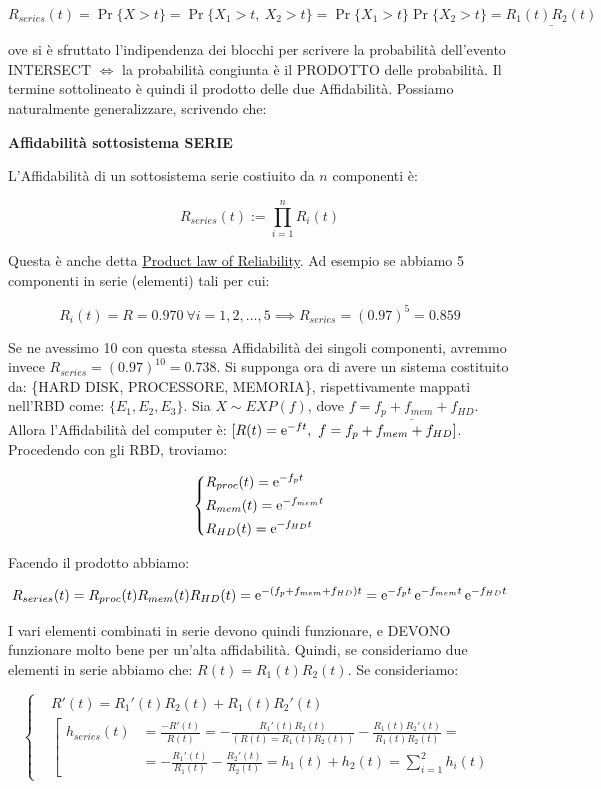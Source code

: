 \[
	R_{series}(t) = \Pr\{X > t\} = \Pr\{X_1 > t,\ X_2 > t\} = \Pr\{X_1 > t\}\Pr\{X_2 > t\} = \underline{R_1(t)R_2(t)}
\]

ove si è sfruttato l'indipendenza dei blocchi per scrivere la probabilità dell'evento INTERSECT $\iff$ la probabilità congiunta è il PRODOTTO delle probabilità. Il termine sottolineato è quindi il prodotto delle due Affidabilità. Possiamo naturalmente generalizzare, scrivendo che:

\begin{thrm}{\textbf{Affidabilità sottosistema SERIE}}

L'Affidabilità di un sottosistema serie costiuito da $n$ componenti è:

\[
	R_{series}(t) := \prod_{i=1}^n{R_i(t)}
\]

\end{thrm}

Questa è anche detta \underline{Product law of Reliability}. Ad esempio se abbiamo 5 componenti in serie (elementi) tali per cui:

\[
	R_i(t) = R = 0.970\ \forall i=1,2,\dots,5 \implies R_{series} = (0.97)^5 = 0.859
\]

Se ne avessimo 10 con questa stessa Affidabilità dei singoli componenti, avremmo invece $R_{series}=(0.97)^{10} = 0.738$. Si supponga ora di avere un sistema costituito da: \{HARD DISK, PROCESSORE, MEMORIA\}, rispettivamente mappati nell'RBD come: $\{E_1,E_2,E_3\}$. Sia $X \sim EXP(f)$, dove $\underline{f = f_p + f_{mem} + f_{HD}}$. Allora l'Affidabilità del computer è: $[R(t) = \mathop{}\!\mathrm{e}^{-ft},\ f = f_p+f_{mem}+f_{HD}]$. 
Procedendo con gli RBD, troviamo:

\[
	\left\{
	\begin{aligned}
	&R_{proc}(t) = \mathop{}\!\mathrm{e}^{-f_pt}\\
	&R_{mem}(t) = \mathop{}\!\mathrm{e}^{-f_{mem}t}\\
	&R_{HD}(t) = \mathop{}\!\mathrm{e}^{-f_{HD}t}
	\end{aligned}
	\right.
\]

Facendo il prodotto abbiamo:

\[
	R_{series}(t) = R_{proc}(t)R_{mem}(t)R_{HD}(t) = \mathop{}\!\mathrm{e}^{-(f_p+f_{mem}+f_{HD})t} = \mathop{}\!\mathrm{e}^{-f_pt}\mathop{}\!\mathrm{e}^{-f_{mem}t}\mathop{}\!\mathrm{e}^{-f_{HD}t}
\]

I vari elementi combinati in serie devono quindi funzionare, e DEVONO funzionare molto bene per un'alta affidabilità. Quindi, se consideriamo due elementi in serie abbiamo che: $R(t) = R_1(t)R_2(t)$. Se consideriamo:

\[
	\left\{
	\begin{aligned}
	&R'(t) = R_1'(t)R_2(t) + R_1(t)R_2'(t)\\
	&\left[
	\begin{aligned}
	h_{series}(t) &= \frac{-R'(t)}{R(t)} = -\frac{R_1'(t)R_2(t)}{(R(t)=R_1(t)R_2(t))} -\frac{R_1(t)R_2'(t)}{R_1(t)R_2(t)} =\\
	&= -\frac{R_1'(t)}{R_1(t)}-\frac{R_2'(t)}{R_2(t)} = h_1(t)+h_2(t) = \sum_{i=1}^2{h_i(t)}
	\end{aligned}
	\right.
	\end{aligned}
	\right.
\]

